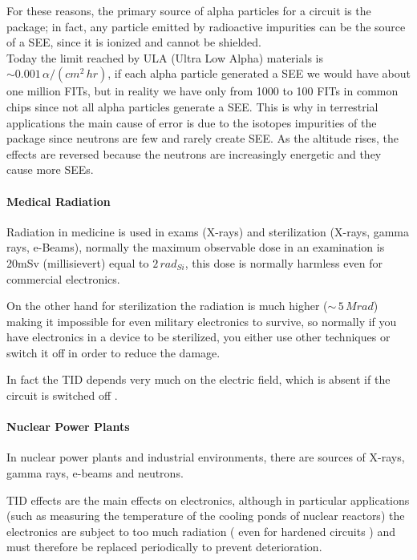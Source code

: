{{{{{					For these reasons, the primary source of alpha particles for a circuit is the package; in fact, any particle emitted by radioactive impurities can be the source of a SEE, since it is ionized and cannot be shielded.\\
					
					Today the limit reached by ULA (Ultra Low Alpha) materials is $\sim 0.001\,\alpha/(cm^2\,hr)$, if each alpha particle generated a SEE we would have about one million FITs, but in reality we have only from 1000 to 100 FITs in common chips since not all alpha particles generate a SEE. This is why in terrestrial applications the main cause of error is due to the isotopes impurities of the package since neutrons are few and rarely create SEE. As the altitude rises, the effects are reversed because the neutrons are increasingly energetic and they cause more SEEs.  
					
				}%

				\paragraph{Medical Radiation}{
					Radiation in medicine is used in exams (X-rays) and sterilization (X-rays, gamma rays, e-Beams), normally the maximum observable dose in an examination is 20mSv (millisievert) equal to $2\,rad_{Si}$, this dose is normally harmless even for commercial electronics.  
					
					On the other hand for sterilization the radiation is much higher ($\sim\,5\,Mrad$) making it impossible for even military electronics to survive, so normally if you have electronics in a device to be sterilized, you either use other techniques or switch it off in order to reduce the damage. 
					
					In fact the TID depends very much on the electric field, which is absent if the circuit is switched off .  
					
				}%
						
				\paragraph{Nuclear Power Plants}{
					In nuclear power plants and industrial environments, there are sources of X-rays, gamma rays, e-beams and neutrons.
					
					TID effects are the main effects on electronics, although in particular applications (such as measuring the temperature of the cooling ponds of nuclear reactors) the electronics are subject to too much radiation ( even for hardened circuits ) and must therefore be replaced periodically to prevent deterioration.
				} %
			
}}}}
